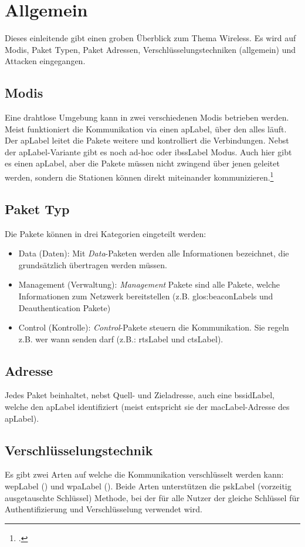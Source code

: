 \chapter{Allgemein}
Dieses einleitende  gibt einen groben Überblick zum Thema Wireless. Es wird auf Modis, Paket Typen, Paket Adressen, Verschlüsselungstechniken (allgemein) und Attacken eingegangen.

\section{Modis}
Eine drahtlose Umgebung kann in zwei verschiedenen Modis betrieben werden.
Meist funktioniert die Kommunikation via einen \gls{apLabel}, über den alles läuft. Der \gls{apLabel} leitet die Pakete weitere und kontrolliert die Verbindungen.
Nebst der \gls{apLabel}-Variante gibt es noch ad-hoc oder \gls{ibssLabel} Modus. Auch hier gibt es einen \gls{apLabel}, aber die Pakete müssen nicht zwingend über jenen geleitet werden, sondern die Stationen können direkt miteinander kommunizieren.\footcite[][38]{WrightCache201503}

\section{Paket Typ}
Die Pakete können in drei Kategorien eingeteilt werden:
\begin{itemize}
	\item Data (Daten): Mit \textit{Data}-Paketen werden alle Informationen bezeichnet, die grundsätzlich übertragen werden müssen.
	\item Management (Verwaltung): \textit{Management} Pakete sind alle Pakete, welche Informationen zum Netzwerk bereitstellen (z.B. \glspl{glos:beaconLabel} und Deauthentication Pakete)
	\item Control (Kontrolle): \textit{Control}-Pakete steuern die Kommunikation. Sie regeln z.B. wer wann senden darf (z.B.: \gls{rtsLabel} und \gls{ctsLabel}).
\end{itemize}

\section{Adresse}
Jedes Paket beinhaltet, nebst Quell- und Zieladresse, auch eine \gls{bssidLabel}, welche den \gls{apLabel} identifiziert (meist entspricht sie der \gls{macLabel}-Adresse des \gls{apLabel}).


\section{Verschlüsselungstechnik}
Es gibt zwei Arten auf welche die Kommunikation verschlüsselt werden kann: \gls{wepLabel} () und \gls{wpaLabel} ().
Beide Arten unterstützen die \gls{pskLabel} (vorzeitig ausgetauschte Schlüssel) Methode, bei der für alle Nutzer der gleiche Schlüssel für Authentifizierung und Verschlüsselung verwendet wird.

